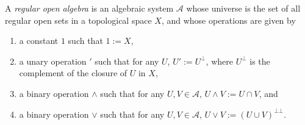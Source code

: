 \documentclass[12pt]{article}
\begin{document}
A \emph{regular open algebra} is an algebraic system $\mathcal{A}$ whose universe is the set of all regular open sets in a topological space $X$, and whose operations are given by
\begin{enumerate}
\item a constant $1$ such that $1:=X$,
\item a unary operation $'$ such that for any $U$,\; $U':=U^\bot$, where $U^\bot$ is the complement of the closure of $U$ in $X$,
\item a binary operation $\wedge$ such that for any $U,V\in \mathcal{A}$, $U\wedge V:=U\cap V$, and
\item a binary operation $\vee$ such that for any $U,V\in \mathcal{A}$, $U\vee V:=(U\cup V)^{\bot\bot}$.
\end{enumerate}
\end{document}
